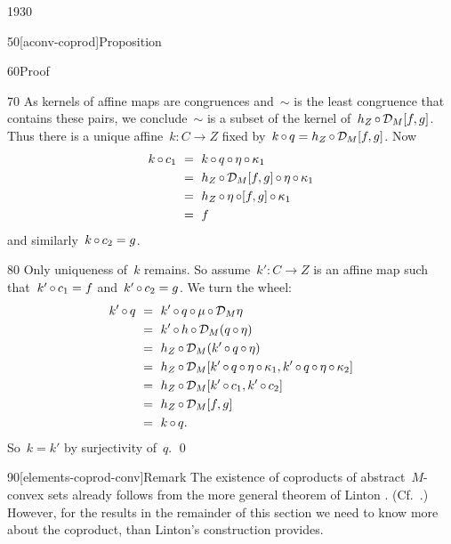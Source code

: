\begin{parsec}{1930}
\begin{point}{50}[aconv-coprod]{Proposition}
\begin{point}{60}{Proof}
\begin{point}{70}
As kernels of affine maps are congruences
    and~$\sim$ is the least congruence that contains these pairs,
    we conclude~$\sim$ is a subset of the kernel
    of~$h_Z \mathop{\circ} \mathcal{D}_M [f,g]$.
Thus there is a unique affine~$k\colon C \to Z$
    fixed by~$k \mathop{\circ} q = h_Z \mathop{\circ} \mathcal{D}_M [f,g]$.
Now
\begin{align*}
    k \mathop{\circ} c_1 
    &\ = \ k \mathop{\circ} q \mathop{\circ} \eta \mathop{\circ} \kappa_1 \\
    &\ = \ h_Z \mathop{\circ} \mathcal{D}_M [f,g]
                            \mathop{\circ} \eta\mathop{\circ} \kappa_1 \\
    &\ = \ h_Z \mathop{\circ} \eta \mathop{\circ}  [f,g]
                            \mathop{\circ} \kappa_1 \\
    &\ = \  f
\end{align*}
and similarly~$k \mathop{\circ} c_2 = g$.
\end{point}
\begin{point}{80}%
Only uniqueness of~$k$ remains.
So assume~$k'\colon C \to Z$ is an affine map
    such that~$k' \mathop{\circ} c_1 = f$
    and~$k' \mathop{\circ} c_2 = g$.
We turn the wheel:
\begin{align*}
    k' \mathop{\circ} q
    & \ = \ k' \mathop{\circ} q \mathop{\circ} \mu \mathop{\circ} \mathcal{D}_M \eta \\
    & \ = \ k' \mathop{\circ} h \mathop{\circ} \mathcal{D}_M (q \mathop{\circ} \eta) \\
    & \ = \ h_Z \mathop{\circ} \mathcal{D}_M (k' \mathop{\circ} q \mathop{\circ} \eta) \\
    & \ = \ h_Z \mathop{\circ} \mathcal{D}_M 
    [ k' \mathop{\circ} q \mathop{\circ} \eta \mathop{\circ} \kappa_1,
    k' \mathop{\circ} q \mathop{\circ} \eta \mathop{\circ} \kappa_2]  \\
    & \ = \ h_Z \mathop{\circ} \mathcal{D}_M 
    [ k' \mathop{\circ} c_1,
    k' \mathop{\circ} c_2]  \\
    & \ = \ h_Z \mathop{\circ} \mathcal{D}_M [ f, g] \\
    & \ = \ k \mathop{\circ} q.
\end{align*}
So~$k = k'$ by surjectivity of~$q$. \qed
\end{point}
\end{point}
\begin{point}{90}[elements-coprod-conv]{Remark}%
The existence of coproducts of abstract~$M$-convex sets already
    follows from the more general theorem of Linton \cite{linton}.
    (Cf.~\cite{barr}.)
However, for the results in the remainder of this section we need to know
    more about the coproduct, than Linton's construction provides.


\end{point}
\end{point}
\end{parsec}
